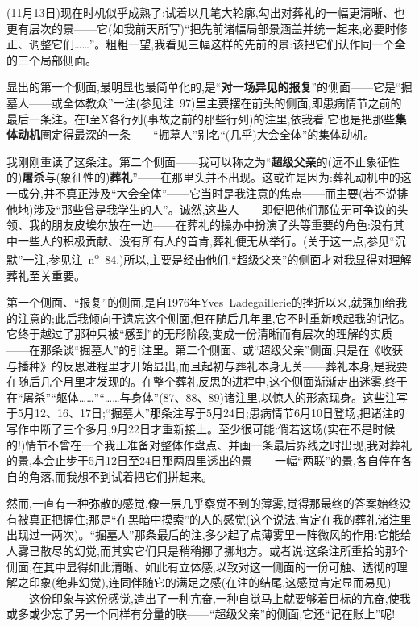 \label{ch18:local:n31}

\dmark{}(11月13日)现在时机似乎成熟了:试着以几笔大轮廓,勾出对葬礼的一幅更清晰、也更有层次的景——它(如我前天所写)“把先前诸幅局部景涵盖并统一起来,必要时修正、调整它们……”。粗粗一望,我看见三幅这样的先前的景:该把它们认作同一个\textbf{全}的三个局部侧面。

显出的第一个侧面,最明显也最简单化的,是“\textbf{对一场异见的报复}”的侧面——它是“掘墓人——或全体教众”一注(参见注~97)里主要摆在前头的侧面,即患病情节之前的最后一条注。在I至X各行列(事故之前的那些行列)的注里,依我看,它也是把那些\textbf{集体动机}圈定得最深的一条——“掘墓人”别名“(几乎)大会全体”的集体动机。

我刚刚重读了这条注。第二个侧面——我可以称之为“\textbf{超级父亲}的(远不止象征性的)\textbf{屠杀}与(象征性的)\textbf{葬礼}”——在那里头并不出现。这或许是因为:葬礼动机中的这一成分,并不真正涉及“大会全体”——它当时是我注意的焦点——而主要(若不说排他地)涉及“那些曾是我学生的人”。诚然,这些人——即便把他们那位无可争议的头领、我的朋友皮埃尔放在一边——在葬礼的操办中扮演了头等重要的角色:没有其中一些人的积极贡献、没有所有人的首肯,葬礼便无从举行。(关于这一点,参见“沉默”一注,参见注~n\textsuperscript{o}~84.)所以,主要是经由他们,“超级父亲”的侧面才对我显得对理解葬礼至关重要。

第一个侧面、“报复”的侧面,是自1976年Yves~Ladegaillerie的挫折以来,就强加给我的注意的;此后我倾向于遗忘这个侧面,但在随后几年里,它不时重新唤起我的记忆。它终于越过了那种只被“感到”的无形阶段,变成一份清晰而有层次的理解的实质——在那条谈“掘墓人”的引注里。第二个侧面、\dmark{}或“超级父亲”侧面,只是在《收获与播种》的反思进程里才开始显出,而且起初与葬礼本身无关——葬礼本身,是我要在随后几个月里才发现的。在整个葬礼反思的进程中,这个侧面渐渐走出迷雾,终于在“屠杀”“躯体……”“……与身体”(87、88、89)诸注里,以惊人的形态现身。这些注写于5月12、16、17日;“掘墓人”那条注写于5月24日;患病情节6月10日登场,把诸注的写作中断了三个多月,9月22日才重新接上。至少很可能:倘若这场(实在不是时候的!)情节不曾在一个我正准备对整体作盘点、并画一条最后界线之时出现,我对葬礼的景,本会止步于5月12日至24日那两周里透出的景——一幅“两联”的景,各自停在各自的角落,而我想不到试着把它们拼起来。

然而,一直有一种弥散的感觉,像一层几乎察觉不到的薄雾,觉得那最终的答案始终没有被真正把握住;那是“在黑暗中摸索”的人的感觉(这个说法,肯定在我的葬礼诸注里出现过一两次)。“掘墓人”那条最后的注,多少起了点薄雾里一阵微风的作用:它能给人雾已散尽的幻觉,而其实它们只是稍稍挪了挪地方。或者说:这条注所重拾的那个侧面,在其中显得如此清晰、如此有立体感,以致对这一侧面的一份可触、透彻的理解之印象(绝非幻觉),连同伴随它的满足之感(在注的结尾,这感觉肯定显而易见)——这份印象与这份感觉,造出了一种亢奋,一种自觉马上就要够着目标的亢奋,使我或多或少忘了另一个同样有分量的联——“超级父亲”的侧面,它还“记在账上”呢!

